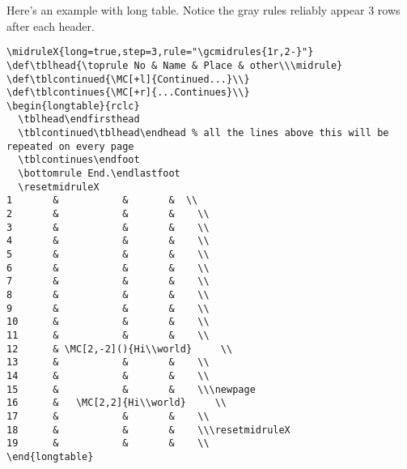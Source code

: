 \documentclass[11pt,parskip=half]{scrartcl}
\begin{document}
Here's an example with long table. Notice the gray rules reliably appear 3 rows after each header.
\begin{verbatim}
\midruleX{long=true,step=3,rule="\gcmidrules{1r,2-}"}
\def\tblhead{\toprule No & Name & Place & other\\\midrule}
\def\tblcontinued{\MC[+l]{Continued...}\\}
\def\tblcontinues{\MC[+r]{...Continues}\\}
\begin{longtable}{rclc}
  \tblhead\endfirsthead
  \tblcontinued\tblhead\endhead % all the lines above this will be repeated on every page
  \tblcontinues\endfoot
  \bottomrule End.\endlastfoot
  \resetmidruleX
1       &           &       &  \\
2       &           &       &    \\
3       &           &       &    \\
4       &           &       &    \\
5       &           &       &    \\
6       &           &       &    \\
7       &           &       &    \\
8       &           &       &    \\
9       &           &       &    \\
10      &           &       &    \\
11      &           &       &    \\
12      & \MC[2,-2](){Hi\\world}     \\
13      &           &       &    \\
14      &           &       &    \\
15      &           &       &    \\\newpage
16      &   \MC[2,2]{Hi\\world}     \\
17      &           &       &    \\
18      &           &       &    \\\resetmidruleX
19      &           &       &    \\
\end{longtable}
\end{verbatim}
\end{document}
